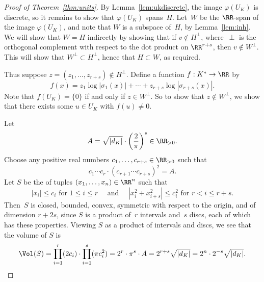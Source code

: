 \begin{proof}[Proof of Theorem~\ref{thm:units}]
  By Lemma~\ref{lem:ukdiscrete}, the image $\varphi(U_K)$ is discrete,
  so it remains to show that $\varphi(U_K)$ spans~$H$.
  Let~$W$ be the $\RR$-span of the image $\varphi(U_K)$, and note that $W$ is a
  subspace of~$H$, by Lemma~\ref{lem:inh}.
  We will show that $W=H$ indirectly by showing that if $v\not \in H^{\perp}$,
  where~$\perp$ is the orthogonal complement with respect to the dot product
  on $\RR^{r+s}$, then $v\not \in W^{\perp}$.
  This will show that $W^{\perp}\subset H^{\perp}$, hence that $H\subset W$,
  as required.

  Thus suppose $z=(z_1,\dots,z_{r+s})\not\in H^{\perp}$.
  Define a function $f:K^*\to \RR$ by
  \begin{equation}\label{eqn:f}
    f(x) = z_1\log|\sigma_1(x)| + \cdots + z_{r+s}\log|\sigma_{r+s}(x)|.
  \end{equation}
  Note that $f(U_K)=\{0\}$ if and only if $z\in W^{\perp}$. So to show
  that $z\not\in W^{\perp}$, we show that there exists some $u\in U_K$
  with $f(u)\neq 0$.

  Let
  \[
    A=\sqrt{|d_K|} \cdot \left( \frac{2}{\pi}\right)^s \in \RR_{>0}.
  \]
  Choose any positive real numbers $c_1,\dots, c_{r+s} \in \RR_{>0}$ such that
  \[
    c_1\cdots c_r\cdot (c_{r+1}\cdots c_{r+s})^2 = A.
  \]
  Let $S$ be the of tuples $(x_1,\dots,x_n) \in \RR^n$ such that
  \[
    |x_i|\leq c_i\text{ for } 1\leq i \leq r
    \quad\text{ and }\quad
    |x_i^2 + x_{i+s}^2| \leq c_i^2 \text{ for } r<i\leq r+s.
  \]
  Then~$S$ is closed, bounded, convex, symmetric with respect to the
  origin, and of dimension $r+2s$, since $S$ is a product of~$r$ intervals
  and~$s$ discs, each of which has these properties. Viewing $S$ as a product
  of intervals and discs, we see that the volume of $S$ is
  \[
    \Vol(S)
    = \prod_{i=1}^r (2c_i) \cdot \prod_{i=1}^s (\pi c_i^2)
    = 2^r\cdot \pi^s \cdot A
    = 2^{r+s}\sqrt{|d_K|}
    = 2^n \cdot 2^{-s}\sqrt{|d_K|}.
  \]


\end{proof}
